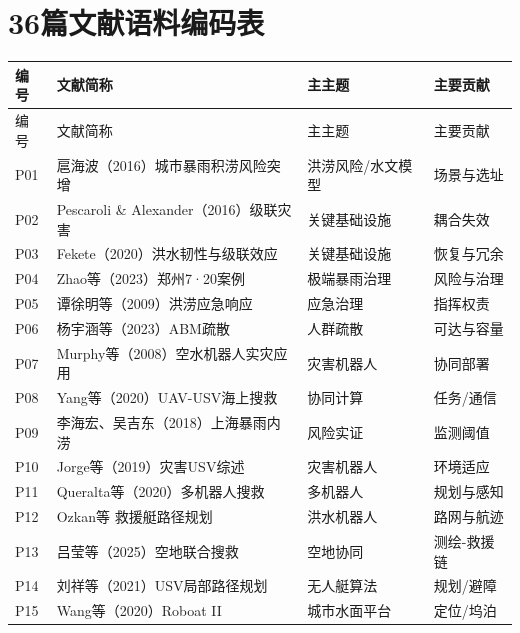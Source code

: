 \documentclass[UTF8,a4paper,zihao=-4]{ctexart}
\begin{document}
\appendix\section{36篇文献语料编码表}\begin{longtable}{p{12mm}p{63mm}p{31mm}p{45mm}}\toprule 编号 & 文献简称 & 主主题 & 主要贡献\\\midrule\endfirsthead\toprule 编号 & 文献简称 & 主主题 & 主要贡献\\\midrule\endhead

P01 & 扈海波（2016）城市暴雨积涝风险突增 & 洪涝风险/水文模型 & 场景与选址\\

P02 & Pescaroli \& Alexander（2016）级联灾害 & 关键基础设施 & 耦合失效\\

P03 & Fekete（2020）洪水韧性与级联效应 & 关键基础设施 & 恢复与冗余\\

P04 & Zhao等（2023）郑州7·20案例 & 极端暴雨治理 & 风险与治理\\

P05 & 谭徐明等（2009）洪涝应急响应 & 应急治理 & 指挥权责\\

P06 & 杨宇涵等（2023）ABM疏散 & 人群疏散 & 可达与容量\\

P07 & Murphy等（2008）空水机器人实灾应用 & 灾害机器人 & 协同部署\\

P08 & Yang等（2020）UAV-USV海上搜救 & 协同计算 & 任务/通信\\

P09 & 李海宏、吴吉东（2018）上海暴雨内涝 & 风险实证 & 监测阈值\\

P10 & Jorge等（2019）灾害USV综述 & 灾害机器人 & 环境适应\\

P11 & Queralta等（2020）多机器人搜救 & 多机器人 & 规划与感知\\

P12 & Ozkan等 救援艇路径规划 & 洪水机器人 & 路网与航迹\\

P13 & 吕莹等（2025）空地联合搜救 & 空地协同 & 测绘-救援链\\

P14 & 刘祥等（2021）USV局部路径规划 & 无人艇算法 & 规划/避障\\

P15 & Wang等（2020）Roboat II & 城市水面平台 & 定位/坞泊\\


\end{longtable}
\end{document}
